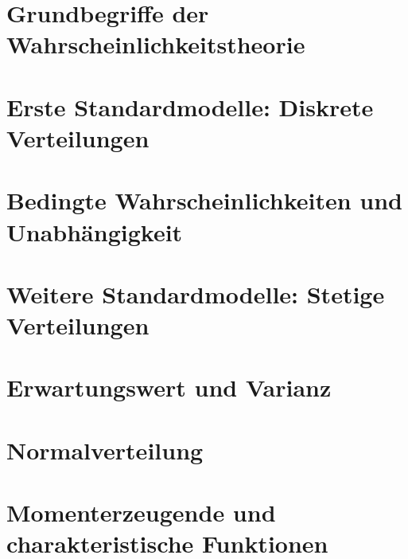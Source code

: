 \documentclass[ngerman, a4paper, 11pt]{report}
\institute{Stochastik}
\begin{document}
\makeTUtitle
    
\tableofcontents

\setcounter{chapter}{-1}


\chapter{Grundbegriffe der Wahrscheinlichkeitstheorie}
\label{chapter_1_grundbegriffe}



\chapter{Erste Standardmodelle: Diskrete Verteilungen}
\label{chapter_2_diskreteVerteilungen}




\chapter{Bedingte Wahrscheinlichkeiten und Unabhängigkeit}
\label{chapter_3_bedingteWahrscheinlichkeiten}





\chapter{Weitere Standardmodelle: Stetige Verteilungen}
\label{chapter_4_stetigeVerteilungen}



\chapter{Erwartungswert und Varianz}
\label{chapter_5_erwartungswertVarianz}




\chapter{Normalverteilung}
\label{chapter_7_normalverteilung}


\chapter{Momenterzeugende und charakteristische Funktionen}
\label{chapter_8_momenterzeugende-charakteristische-Funktionen}


\end{document}
